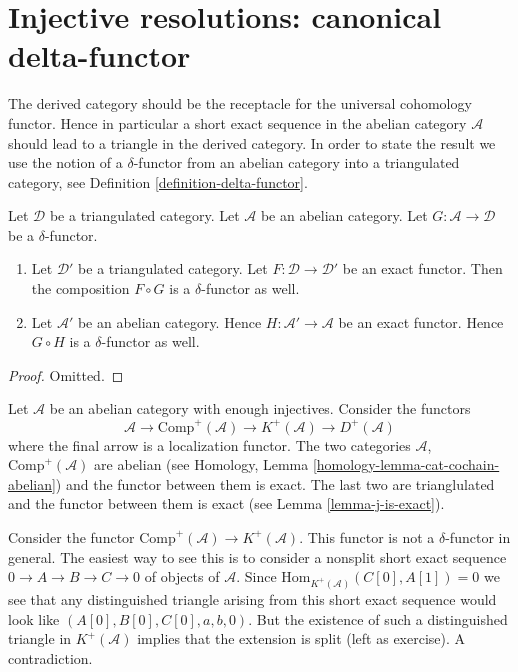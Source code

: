 \section{Injective resolutions: canonical delta-functor}
\label{section-canonical-delta-functor}

\noindent
The derived category should be the receptacle for the universal
cohomology functor. Hence in particular a short exact sequence
in the abelian category $\mathcal{A}$ should lead to a triangle
in the derived category. In order to state the result we use
the notion of a $\delta$-functor from an abelian category
into a triangulated category, see
Definition \ref{definition-delta-functor}.

\begin{lemma}
\label{lemma-exact-compose-delta-functor}
Let $\mathcal{D}$ be a triangulated category.
Let $\mathcal{A}$ be an abelian category.
Let $G : \mathcal{A} \to \mathcal{D}$ be a $\delta$-functor.
\begin{enumerate}
\item Let $\mathcal{D}'$ be a triangulated category.
Let $F : \mathcal{D} \to \mathcal{D}'$ be an exact functor.
Then the composition $F \circ G$ is a $\delta$-functor as well.
\item Let $\mathcal{A}'$ be an abelian category. Hence
$H : \mathcal{A}' \to \mathcal{A}$ be an exact functor.
Hence $G \circ H$ is a $\delta$-functor as well.
\end{enumerate}
\end{lemma}

\begin{proof}
Omitted.
\end{proof}

\noindent
Let $\mathcal{A}$ be an abelian category with enough injectives.
Consider the functors
$$
\mathcal{A} \to \text{Comp}^{+}(\mathcal{A})
\to K^{+}(\mathcal{A}) \to D^{+}(\mathcal{A})
$$
where the final arrow is a localization functor.
The two categories $\mathcal{A}$,
$\text{Comp}^{+}(\mathcal{A})$ are abelian
(see
Homology, Lemma \ref{homology-lemma-cat-cochain-abelian})
and the functor between them is exact. The last two are trianglulated and the
functor between them is exact (see Lemma \ref{lemma-j-is-exact}).

\medskip\noindent
Consider the functor
$\text{Comp}^{+}(\mathcal{A}) \to K^{+}(\mathcal{A})$.
This functor is not a $\delta$-functor in general.
The easiest way to see this is to consider a nonsplit
short exact sequence $0 \to A \to B \to C \to 0$
of objects of $\mathcal{A}$. Since
$\text{Hom}_{K^{+}(\mathcal{A})}(C[0], A[1]) = 0$
we see that any distinguished triangle arising from
this short exact sequence would look like
$(A[0], B[0], C[0], a, b, 0)$. But the existence of such a
distinguished triangle in $K^{+}(\mathcal{A})$ implies
that the extension is split (left as exercise). A contradiction.

